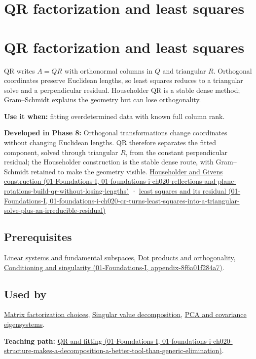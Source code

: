 \hypertarget{appendix-c3421e6b4f2c}{}
\section*{QR factorization and least squares}
\section{QR factorization and least squares}\label{appendix-c3421e6b4f2c-qr-factorization-and-least-squares}

QR writes \(A=QR\) with orthonormal columns in \(Q\) and triangular \(R\). Orthogonal coordinates preserve Euclidean lengths, so least squares reduces to a triangular solve and a perpendicular residual. Householder QR is a stable dense method; Gram--Schmidt explains the geometry but can lose orthogonality.

\textbf{Use it when:} fitting overdetermined data with known full column rank.

\textbf{Developed in Phase 8:} Orthogonal transformations change coordinates without changing Euclidean lengths. QR therefore separates the fitted component, solved through triangular \(R\), from the constant perpendicular residual; the Householder construction is the stable dense route, with Gram--Schmidt retained to make the geometry visible. \href{../01-Foundations-I/main.pdf\#nameddest=01-foundations-i-ch020-reflections-and-plane-rotations-build-qr-without-losing-lengths}{Householder and Givens construction (01-Foundations-I, 01-foundations-i-ch020-reflections-and-plane-rotations-build-qr-without-losing-lengths)} · \href{../01-Foundations-I/main.pdf\#nameddest=01-foundations-i-ch020-qr-turns-least-squares-into-a-triangular-solve-plus-an-irreducible-residual}{least squares and its residual (01-Foundations-I, 01-foundations-i-ch020-qr-turns-least-squares-into-a-triangular-solve-plus-an-irreducible-residual)}

\subsection{Prerequisites}\label{appendix-c3421e6b4f2c-prerequisites}

\hyperref[appendix-8572a4a060c1]{Linear systems and fundamental subspaces}, \hyperref[appendix-8bc4e8fc547c]{Dot products and orthogonality}, \href{../01-Foundations-I/main.pdf\#nameddest=appendix-8f6a01f284a7}{Conditioning and singularity (01-Foundations-I, appendix-8f6a01f284a7)}.

\subsection{Used by}\label{appendix-c3421e6b4f2c-used-by}

\hyperref[appendix-221a483bec2d]{Matrix factorization choices}, \hyperref[appendix-1fad5e7f36fa]{Singular value decomposition}, \hyperref[appendix-ad175ef3c5bf]{PCA and covariance eigensystems}.

\textbf{Teaching path:} \href{../01-Foundations-I/main.pdf\#nameddest=01-foundations-i-ch020-structure-makes-a-decomposition-a-better-tool-than-generic-elimination}{QR and fitting (01-Foundations-I, 01-foundations-i-ch020-structure-makes-a-decomposition-a-better-tool-than-generic-elimination)}.
